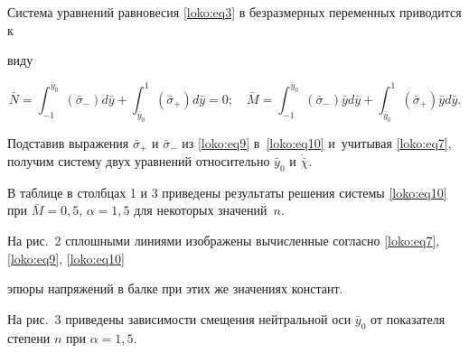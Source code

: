 Система уравнений равновесия \eqref{loko:eq3} в безразмерных переменных приводится к

виду

\begin{equation}

\label{loko:eq10}

\bar {N}=\int_{-1}^{\bar {y}_0}\left( \bar {\sigma }_- \right)d\bar {y}+

\int_{\bar {y}_0}^1 \left( \bar {\sigma }_+ \right) d\bar {y}= 0; \quad

\bar {M}=\int_{-1}^{\bar {y}_0} \left( \bar {\sigma }_-  \right) \bar {y}d\bar {y}+

\int_{\bar {y}_0}^1 \left( \bar {\sigma }_+ \right) \bar {y} d \bar {y}.

\end{equation}

Подставив выражения $\bar {\sigma }_+$ и $\bar {\sigma }_- $ из \eqref{loko:eq9} в~\eqref{loko:eq10} и~учитывая \eqref{loko:eq7}, получим систему двух уравнений относительно $\bar {y}_0$ и $\dot {\bar {\chi}}$. 



В таблице в столбцах 1 и 3 приведены результаты решения системы \eqref{loko:eq10} при $\bar {M}=0,5$, $\alpha =1,5$ для некоторых значений~$n$.

На рис.~2 сплошными линиями изображены вычисленные согласно \eqref{loko:eq7}, \eqref{loko:eq9}, \eqref{loko:eq10}

эпюры напряжений в балке при этих же значениях констант.

На рис.~3 приведены зависимости смещения нейтральной оси $\bar {y}_0$ от показателя степени $n$ при $\alpha=1,5$.



